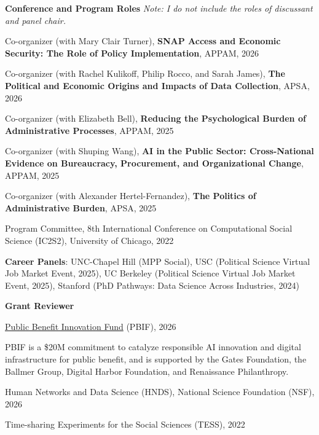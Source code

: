 \documentclass[10pt, letterpaper]{article}
\renewenvironment{itemize}{
\begin{list}{}{
        \setlength{\leftmargin}{1.5em}
        \setlength{\itemsep}{0.10em}
        \setlength{\parskip}{0pt}
        \setlength{\parsep}{0.10em}
    }
}{
\end{list}
}
\begin{document}
\begin{itemize}
  \item \textbf{Conference and Program Roles}  
  \textit{Note: I do not include the roles of discussant and panel chair.} 
  \begin{itemize}
    \item Co-organizer (with Mary Clair Turner), \textbf{SNAP Access and Economic Security: The Role of Policy Implementation}, APPAM, 2026
    \item Co-organizer (with Rachel Kulikoff, Philip Rocco, and Sarah James), \textbf{The Political and Economic Origins and Impacts of Data Collection}, APSA, 2026
    \item Co-organizer (with Elizabeth Bell), \textbf{Reducing the Psychological Burden of Administrative Processes}, APPAM, 2025
    \item Co-organizer (with Shuping Wang), \textbf{AI in the Public Sector: Cross-National Evidence on Bureaucracy, Procurement, and Organizational Change}, APPAM, 2025
    \item Co-organizer (with Alexander Hertel-Fernandez), \textbf{The Politics of Administrative Burden}, APSA, 2025 
    \item Program Committee, 8th International Conference on Computational Social Science (IC2S2), University of Chicago, 2022
  \end{itemize}

  \item \textbf{Career Panels}: UNC-Chapel Hill (MPP Social), USC (Political Science Virtual Job Market Event, 2025), UC Berkeley (Political Science Virtual Job Market Event, 2025), Stanford (PhD Pathways: Data Science Across Industries, 2024)
  \item \textbf{Grant Reviewer} 
  
  \begin{itemize}
    \item \href{https://www.publicbenefitinnovationfund.org/}{Public Benefit Innovation Fund} (PBIF), 2026
    \begin{itemize}
    \item PBIF is a \$20M commitment to catalyze responsible AI innovation and digital infrastructure for public benefit, and is supported by the Gates Foundation, the Ballmer Group, Digital Harbor Foundation, and Renaissance Philanthropy.
    \end{itemize}
    \item Human Networks and Data Science (HNDS), National Science Foundation (NSF), 2026 
    \item Time-sharing Experiments for the Social Sciences (TESS), 2022
  \end{itemize}


\end{itemize}
\end{document}
